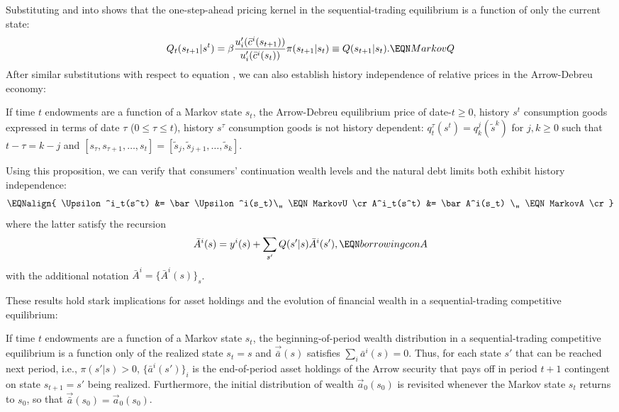 Substituting  and  into
 shows that the one-step-ahead pricing kernel in the sequential-trading
equilibrium is   a function  of only the current state:
$$
Q_t(s_{t+1} | s^t) = \beta
{ u'_i(\bar c^i(s_{t+1})) \over u'_i(\bar c^i(s_t)) }
\pi(s_{t+1} | s_t) \equiv Q(s_{t+1} | s_t).   \EQN MarkovQ
$$
After similar substitutions with respect to equation ,
we can also
establish history independence of  relative prices in the
Arrow-Debreu economy:




\medskip
{}  If time $t$  endowments are a function of a Markov
state $s_t$, the Arrow-Debreu equilibrium price of date-$t\geq 0$,
history $s^t$
consumption goods expressed in terms of date $\tau$ ($0\leq \tau \leq t$),
history $s^\tau$
consumption goods is not history dependent:
$q^\tau_t(s^t) = q^{j}_{k}(\tilde s^{k})$ for $j, k \geq 0$
such that $t-\tau=k-j$ and
$[s_\tau, s_{\tau+1}, \ldots , s_t] =
 [\tilde s_{j}, \tilde s_{j+1}, \ldots , \tilde s_{k}]$.
\medskip

\noindent
Using this proposition, we can verify that consumers' 
continuation wealth levels  and
the natural debt limits  both
exhibit history independence:
$$\EQNalign{
 \Upsilon^i_t(s^t) &= \bar \Upsilon^i(s_t)\,, \EQN MarkovU 
\cr
 A^i_t(s^t) &= \bar A^i(s_t) \,,              \EQN MarkovA 
\cr}
$$
where the latter satisfy the recursion
$$ \bar A^i(s) = y^i(s) + \sum_{s'} Q(s'|s) \bar A^i(s'),  \EQN borrowingconA $$
with the additional notation 
$\bar A^i = \{\bar A^i(s)\}_s$.


These results hold stark implications for asset holdings
and the evolution of financial wealth in a 
sequential-trading competitive equilibrium:

\medskip
{} If time $t$ endowments are 
a function of a Markov state $s_t$, 
the beginning-of-period wealth distribution in a
sequential-trading competitive equilibrium is
a function only of the realized state $s_t=s$ and
$\vec {\bar a}(s)$ satisfies $\sum_i \bar a^i(s)=0$.
Thus, for each state $s'$ that can be reached next 
period, i.e., $\pi(s'|s)>0$, $\{\bar a^i(s')\}_i$ is the 
end-of-period asset holdings of the Arrow security that 
pays off in period $t+1$ contingent on state $s_{t+1}=s'$
being realized. Furthermore, the initial distribution of 
wealth $\vec {a}_0(s_0)$ is revisited whenever 
the Markov state $s_t$ returns to $s_0$, so that 
$\vec {\bar a}(s_0) = \vec { a}_0(s_0)$.
\medskip


